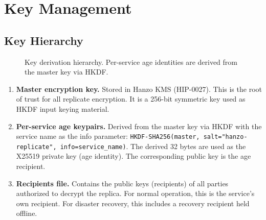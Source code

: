 \section{Key Management}


\subsection{Key Hierarchy}

\begin{figure}[H]
\centering
{}
\caption{Key derivation hierarchy. Per-service age identities are derived
from the master key via HKDF.}
\label{fig:keys}
\end{figure}

\begin{enumerate}[nosep]
    \item \textbf{Master encryption key.} Stored in Hanzo KMS (HIP-0027).
    This is the root of trust for all replicate encryption. It is a 256-bit
    symmetric key used as HKDF input keying material.

    \item \textbf{Per-service age keypairs.} Derived from the master key via
    HKDF with the service name as the info parameter:
    \texttt{HKDF-SHA256(master, salt="hanzo-replicate", info=service\_name)}.
    The derived 32 bytes are used as the X25519 private key (age identity).
    The corresponding public key is the age recipient.

    \item \textbf{Recipients file.} Contains the public keys (recipients) of
    all parties authorized to decrypt the replica. For normal operation, this
    is the service's own recipient. For disaster recovery, this includes a
    recovery recipient held offline.
\end{enumerate}

